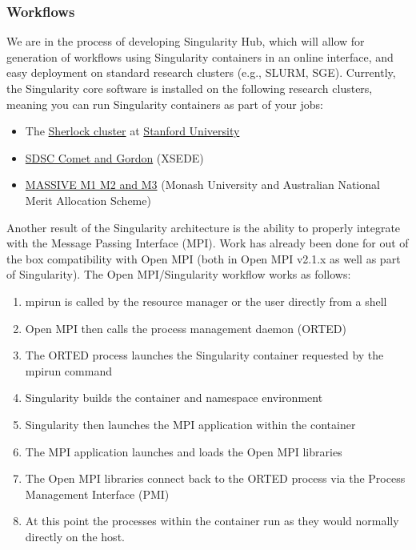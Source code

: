 \documentclass[a4paper]{article}
\newcounter{subsubsubsection}[subsubsection]
\begin{document}
\subsubsection{Workflows}

We are in the process of developing Singularity Hub, which will allow for generation of workflows using Singularity containers in an online interface, and easy deployment on standard research clusters (e.g., SLURM, SGE). Currently, the Singularity core software is installed on the following research clusters, meaning you can run Singularity containers as part of your jobs:

\begin{itemize}
\item The \href{http://sherlock.stanford.edu/}{Sherlock cluster} at \href{https://srcc.stanford.edu/}{Stanford University}
\item \href{https://www.xsede.org/news/-/news/item/7624}{SDSC Comet and Gordon} (XSEDE)
\item \href{http://docs.massive.org.au/index.html}{MASSIVE M1 M2 and M3} (Monash University and Australian National Merit Allocation Scheme)

\end{itemize}

Another result of the Singularity architecture is the ability to properly integrate with the Message Passing Interface (MPI). Work has already been done for out of the box compatibility with Open MPI (both in Open MPI v2.1.x as well as part of Singularity). The Open MPI/Singularity workflow works as follows:

\begin{enumerate}
\item mpirun is called by the resource manager or the user directly from a shell
\item Open MPI then calls the process management daemon (ORTED)
\item The ORTED process launches the Singularity container requested by the mpirun command
\item Singularity builds the container and namespace environment
\item Singularity then launches the MPI application within the container
\item The MPI application launches and loads the Open MPI libraries
\item The Open MPI libraries connect back to the ORTED process via the Process Management Interface (PMI)
\item At this point the processes within the container run as they would normally directly on the host.
\end{enumerate}
\end{document}
